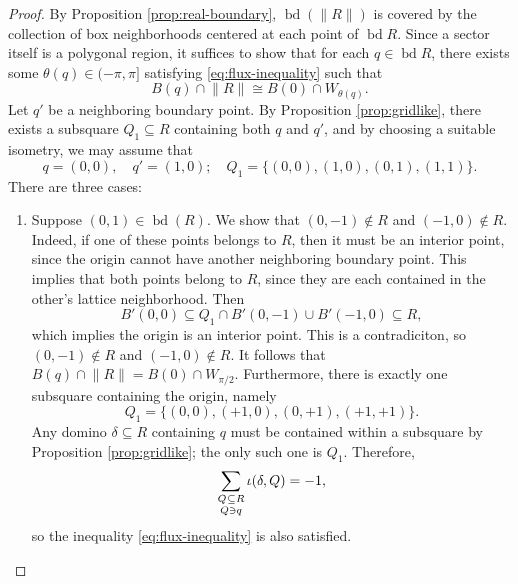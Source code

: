 \begin{proof}
  By Proposition \ref{prop:real-boundary}, $\operatorname{bd} (\lVert R \rVert)$ is covered by the collection of box neighborhoods centered at each point of $\operatorname{bd} R$. Since a sector itself is a polygonal region, it suffices to show that for each $q \in \operatorname{bd} R$, there exists some $\theta(q) \in (-\pi, \pi]$  satisfying \eqref{eq:flux-inequality} such that
  \begin{equation}
    B(q)  \cap \lVert R \rVert \cong B(0) \cap W_{\theta(q)}.
  \end{equation}
  Let $q'$ be a neighboring boundary point. By Proposition \ref{prop:gridlike}, there exists a subsquare $Q_1 \subseteq R$ containing both $q$ and $q'$, and by choosing a suitable isometry, we may assume that 
  \begin{equation}
    q = (0, 0), \quad q' = (1, 0); \quad Q_1 = \{ (0, 0), (1, 0), (0, 1), (1, 1)\}.
  \end{equation}
  There are three cases:
  \begin{enumerate}
      \item Suppose $(0, 1) \in \operatorname{bd}(R)$.
      We show that $(0, -1) \not\in R$ and $(-1, 0) \not\in R$.
      Indeed, if one of these points belongs to $R$, then it must be an interior point, since the origin cannot have another neighboring boundary point.
      This implies that both points belong to $R$, since they are each contained in the other's lattice neighborhood.
      Then
      \begin{equation}
        B'(0, 0) \subseteq Q_1 \cap B'(0, -1) \cup B'(-1, 0) \subseteq R,
      \end{equation}
      which implies the origin is an interior point. This is a contradiciton, so $(0, -1) \not\in R$ and $(-1, 0) \not\in R$. It follows that $B(q) \cap \lVert R \rVert = B(0) \cap W_{\pi/2}$.
      Furthermore, there is exactly one subsquare containing the origin, namely
      \begin{equation}
        Q_1 = \{ (0, 0), (+1, 0), (0, +1), (+1, +1)\}.
      \end{equation}
      Any domino $\delta \subseteq R$ containing $q$ must be contained within a subsquare by Proposition \ref{prop:gridlike}; the only such one is $Q_1$. Therefore,
      \begin{equation}
        \sum_{\substack{Q \mskip 1mu \subseteq \mskip 0.3mu R \\[0.2ex] Q \ni q}} \iota(\delta, Q) = -1,
      \end{equation}
      so the inequality \eqref{eq:flux-inequality} is also satisfied.


\end{enumerate}
\end{proof}
